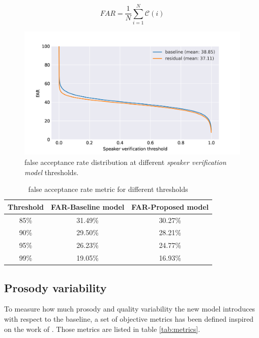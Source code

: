 \begin{equation}
    FAR = \frac{1}{N}\sum_{i=1}^{N} \mathcal{C}(i)
    \label{eq:far}
\end{equation}


\begin{figure}[h]
	\centering
	\includegraphics[width=.7\linewidth]{tts/images/far}
	\caption[False acceptance rates for the TTS models]{false acceptance rate distribution at different \textit{speaker verification model} thresholds.}
	\label{fig:far}
\end{figure}

\begin{table}[h]
	\centering
	\caption[False acceptance rates for different thresholds of the TTS models]{false acceptance rate metric for different thresholds}
	\footnotesize
	\begin{tabular}{ccc}
		\toprule
		\textbf{Threshold} & \textbf{FAR-Baseline model} & \textbf{FAR-Proposed model} \\
		\midrule
		85\% & 31.49\% & 30.27\% \\

		90\% & 29.50\% & 28.21\% \\

		95\% & 26.23\% & 24.77\% \\

		99\% & 19.05\% & 16.93\% \\
		\bottomrule
	\end{tabular}
	\label{tab:far}
\end{table}



\subsection{Prosody variability}
To measure how much prosody and quality variability the new model introduces with respect to the baseline, a set of objective metrics has been defined inspired on the work of \autocite{Raitio2020}. Those metrics are listed in table \ref{tab:metrics}.

